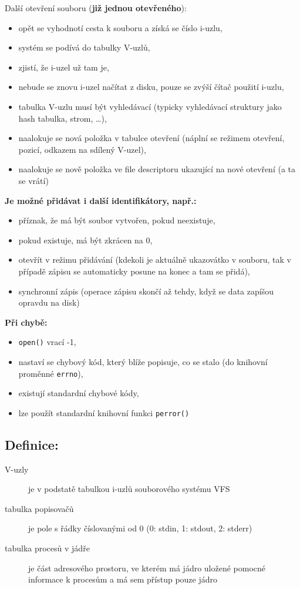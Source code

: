 \documentclass[a4paper, 11pt]{article}
\newcommand{\tcmd}[1]{\texttt{#1}}
\begin{document}
Další otevření souboru (\textbf{již jednou otevřeného}):
\begin{itemize}
    \item opět se vyhodnotí cesta k souboru a získá se číslo i-uzlu,
    \item systém se podívá do tabulky V-uzlů,
    \item zjistí, že i-uzel už tam je,
    \item nebude se znovu i-uzel načítat z disku, pouze se zvýší čítač použití i-uzlu,
    \item tabulka V-uzlu musí být vyhledávací (typicky vyhledávací struktury jako hash tabulka, strom, \ldots),
    \item naalokuje se nová položka v tabulce otevření (náplní se režimem otevření, pozicí, odkazem na sdílený V-uzel),
    \item naalokuje se nově položka ve file descriptoru ukazující na nové otevření (a ta se vrátí)
\end{itemize}
 
\textbf{Je možné přidávat i další identifikátory, např.:}
\begin{itemize}
    \item příznak, že má být soubor vytvořen, pokud neexistuje,
    \item pokud existuje, má být zkrácen na 0,
    \item otevřít v režimu přidávání (kdekoli je aktuálně ukazovátko v souboru, tak v případě zápisu se automaticky posune na konec a tam se přidá),
    \item synchronní zápis (operace zápisu skončí až tehdy, když se data zapíšou opravdu na disk)
\end{itemize}
 
\textbf{Při chybě:}
\begin{itemize}
    \item \tcmd{open()} vrací -1,
    \item nastaví se chybový kód, který blíže popisuje, co se stalo (do knihovní proměnné \tcmd{errno}),
    \item existují standardní chybové kódy,
    \item lze použít standardní knihovní funkci \tcmd{perror()}
\end{itemize}
 
\subsection*{Definice:}
\begin{description}
\item[V-uzly] je v podstatě tabulkou i-uzlů souborového systému VFS

\item[tabulka popisovačů] je pole s řádky číslovanými od 0 (0: stdin, 1: stdout, 2: stderr)

\item[tabulka procesů v jádře] je část adresového prostoru, ve kterém má jádro uložené pomocné informace k procesům a má sem přístup pouze jádro
\end{description} 
 
\end{document}
